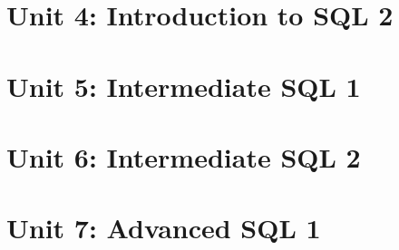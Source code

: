 \documentclass[catalan, a4paper, 12pt, titlepage]{article}
\begin{document}
\section{Unit 4: Introduction to SQL 2}

%





\section{Unit 5: Intermediate SQL 1}

%








\section{Unit 6: Intermediate SQL 2}

%








\section{Unit 7: Advanced SQL 1}
\end{document}
